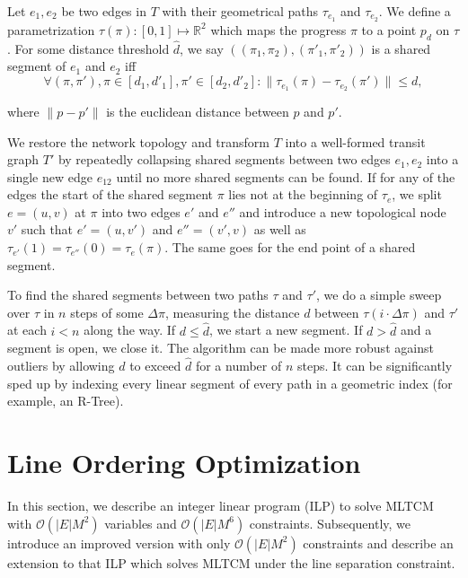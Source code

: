 \documentclass{llncs}
\begin{document}
Let $e_1, e_2$ be two edges in $T$ with their geometrical paths $\tau_{e_1}$ and $\tau_{e_2}$. We define a parametrization $\tau(\pi): [0,1] \mapsto \mathbb{R}^2$ which maps the progress $\pi$ to a point $p_d$ on $\tau$. For some distance threshold $\hat{d}$, we say $((\pi_1, \pi_2), ({\pi'}_1, {\pi'}_2))$ is a shared segment of $e_1$ and $e_2$ iff \[\forall (\pi, \pi'), \pi \in [d_1, {d'}_1], \pi' \in [d_2, {d'}_2] : \|\tau_{e_1}(\pi) - \tau_{e_2}(\pi')\| \leq d,\]

where $\|p - p'\|$ is the euclidean distance between $p$ and $p'$.

We restore the network topology and transform $T$ into a well-formed transit graph $T'$ by repeatedly collapsing shared segments between two edges $e_1, e_2$ into a single new edge $e_{12}$ until no more shared segments can be found. If for any of the edges the start of the shared segment $\pi$ lies not at the beginning of $\tau_e$, we split $e = (u, v)$ at $\pi$ into two edges $e'$ and $e''$ and introduce a new topological node $v'$ such that $e' = (u, v')$ and $e'' = (v', v)$ as well as $\tau_{e'}(1) = \tau_{e''}(0) = \tau_{e}(\pi)$. The same goes for the end point of a shared segment.

To find the shared segments between two paths $\tau$ and $\tau'$, we do a simple sweep over $\tau$ in $n$ steps of some $\Delta\pi$, measuring the distance $d$ between $\tau(i\cdot\Delta\pi)$ and $\tau'$ at each $i < n$ along the way. If $d \leq \hat{d}$, we start a new segment. If $d > \hat{d}$ and a segment is open, we close it. The algorithm can be made more robust against outliers by allowing $d$ to exceed $\hat{d}$ for a number of $n$ steps. It can be significantly sped up by indexing every linear segment of every path in a geometric index (for example, an R-Tree).

%
\section{Line Ordering Optimization}\label{SEC:ordering}
%

In this section, we describe an integer linear program (ILP) to solve MLTCM with $\mathcal{O}(|E|M^{2})$ variables and $\mathcal{O}(|E|M^{6})$ constraints.
Subsequently, we introduce an improved version with only $\mathcal{O}(|E|M^2)$ constraints and describe an extension to that ILP which solves MLTCM under the line separation constraint.

%
\end{document}
